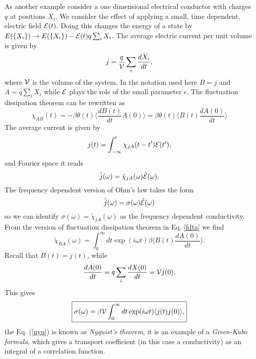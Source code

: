 \documentclass[11pt]{report}
\begin{document}
As another example consider a one dimensional electrical conductor with charges $q$ 
at positions $X_i$. We consider the effect of applying a small, time dependent, electric field ${\cal E}(t)$. Doing this changes the energy of a state by $E(\{X_i\}) \to  E(\{X_i\}) - {\cal E}(t)q\sum_i X_i$. The
average electric current per unit volume is given by
\begin{equation}
j = \frac{q}{\cal V}\sum_i \frac{dX_i}{dt},
\end{equation}
where ${\cal V}$ is the volume of the system. In the notation used here $B = j$ and $A =q\sum_i X_i$ while $ {\cal E}$ plays the role of the small parameter $\epsilon$. The fluctuation dissipation theorem can be rewritten as
\begin{equation}
 \chi_{AB}(t) = -\beta\theta(t) \langle \frac{dB(t)}{dt} A(0)\rangle = \beta\theta(t) \langle B(t)\frac{dA(0)}{dt} \rangle\label{fdta}
\end{equation}
The average current is given by
\begin{equation}
j(t) = \int_{-\infty}^t  \chi_{jA}(t-t'){\cal E}(t'),
\end{equation}
and Fourier space it reads
\begin{equation}
{\tilde j}(\omega) = \tilde\chi_{jA}(\omega)\tilde{\cal E}(\omega).
\end{equation}
The frequency dependent version of Ohm's law takes the form
\begin{equation}
\tilde j(\omega) = \sigma(\omega) \tilde{\cal E}(\omega)
\end{equation}
so we can identify $\sigma(\omega)=\tilde\chi_{jA}(\omega)$ as the frequency dependent conductivity.
From the version  of fluctuation dissipation theorem in Eq. \eqref{fdta} we find
\begin{equation}
\tilde\chi_{BA}(\omega) = \int_0^\infty dt \exp(i\omega t) \beta \langle B(t)\frac{dA(0)}{dt} \rangle.
\end{equation} 
Recall that $B(t)=j(t)$, while
\begin{equation}
\frac{dA(0)}{dt} = q\sum_i \frac{dX(0)}{dt} = {\cal V}j(0).
\end{equation}
This gives
\begin{equation}
\boxed{
\sigma(\omega) = \beta {\cal V}\int_0^\infty dt \exp(i\omega t) \langle j(t)j(0) \rangle,}\label{nyq}
\end{equation} 
 the Eq. (\ref{nyq}) is known as {\em Nyquist's theorem}, it is an example of a {\em Green-Kubo formula}, which gives a transport coefficient (in this case a conductivity) as an integral
 of a correlation function. 
\end{document}
